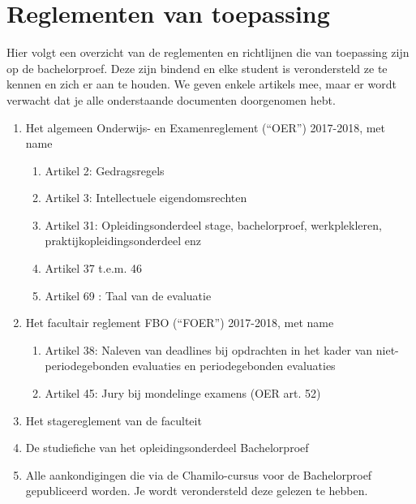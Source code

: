 \section{Reglementen van toepassing}
Hier volgt een overzicht van de reglementen en richtlijnen die van toepassing zijn op de bachelorproef. Deze zijn bindend en elke student is verondersteld ze te kennen en zich er aan te houden. We geven enkele artikels mee, maar er wordt verwacht dat je alle onderstaande documenten doorgenomen hebt.

\begin{enumerate}
	\item Het algemeen Onderwijs- en Examenreglement (“OER”) 2017-2018, met name
	\begin{enumerate}
		\item Artikel 2: Gedragsregels
		\item Artikel 3: Intellectuele eigendomsrechten
		\item Artikel 31: Opleidingsonderdeel stage, bachelorproef, werkplekleren, praktijkopleidingsonderdeel enz
		\item Artikel 37 t.e.m. 46
		\item Artikel 69 : Taal van de evaluatie
	\end{enumerate}
	\item Het facultair reglement FBO (“FOER”) 2017-2018, met name
	\begin{enumerate}
		\item Artikel 38: Naleven van deadlines bij opdrachten in het kader van niet-periodegebonden evaluaties en periodegebonden
		evaluaties
		\item Artikel 45: Jury bij mondelinge examens (OER art. 52)
	\end{enumerate}
	\item Het stagereglement van de faculteit
	\item De studiefiche van het opleidingsonderdeel Bachelorproef
	\item Alle aankondigingen die via de Chamilo-cursus voor de Bachelorproef gepubliceerd worden. Je wordt verondersteld deze gelezen te hebben.
\end{enumerate}


